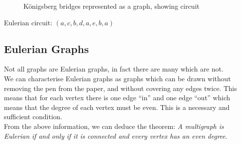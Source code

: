 \begin{minipage}{0.5\textwidth}
    \begin{figure}[H]
        \centering
        \caption{K\"{o}nigsberg bridges represented as a graph, showing circuit}
    \end{figure}
\end{minipage} \hfill
\begin{minipage}{0.45\textwidth}
Eulerian circuit: $(a, c, b, d, a, e, b, a)$
\end{minipage}

\subsection{Eulerian Graphs}
Not all graphs are Eulerian graphs, in fact there are many which are not.\\

We can characterise Eulerian graphs as graphs which can be drawn without removing the pen from the paper, and without covering any edges twice. This means that for each vertex there is one edge ``in'' and one edge ``out'' which means that the degree of each vertex must be even. This is a necessary and sufficient condition. \\

From the above information, we can deduce the theorem: \textit{A multigraph is Eulerian if and only if it is connected and every vertex has an even degree}.\\

